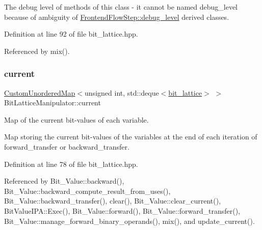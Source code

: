 The debug level of methods of this class -\/ it cannot be named debug\+\_\+level because of ambiguity of \hyperlink{classDesignFlowStep_a5cc9222e58f094a5b1b78cb4426ef8b4}{Frontend\+Flow\+Step\+::debug\+\_\+level} derived classes. 



Definition at line 92 of file bit\+\_\+lattice.\+hpp.



Referenced by mix().

\mbox{\label{classBitLatticeManipulator_a5fd2618eb910bb8d68ad7eea945ec12a}} 
\subsubsection{\texorpdfstring{current}{current}}
{\footnotesize\ttfamily \hyperlink{custom__map_8hpp_ad1ed68f2ff093683ab1a33522b144adc}{Custom\+Unordered\+Map}$<$unsigned int, std\+::deque$<$\hyperlink{bit__lattice_8hpp_ab732360111c810c4eaeb4c8b81d160d6}{bit\+\_\+lattice}$>$ $>$ Bit\+Lattice\+Manipulator\+::current\hspace{0.3cm}{\ttfamily [protected]}}



Map of the current bit-\/values of each variable. 

Map storing the current bit-\/values of the variables at the end of each iteration of forward\+\_\+transfer or backward\+\_\+transfer. 

Definition at line 78 of file bit\+\_\+lattice.\+hpp.



Referenced by Bit\+\_\+\+Value\+::backward(), Bit\+\_\+\+Value\+::backward\+\_\+compute\+\_\+result\+\_\+from\+\_\+uses(), Bit\+\_\+\+Value\+::backward\+\_\+transfer(), clear(), Bit\+\_\+\+Value\+::clear\+\_\+current(), Bit\+Value\+I\+P\+A\+::\+Exec(), Bit\+\_\+\+Value\+::forward(), Bit\+\_\+\+Value\+::forward\+\_\+transfer(), Bit\+\_\+\+Value\+::manage\+\_\+forward\+\_\+binary\+\_\+operands(), mix(), and update\+\_\+current().

\mbox{\label{classBitLatticeManipulator_a1e4f6088cdd2a8c6c8e1e3b1f72810ca}} 
